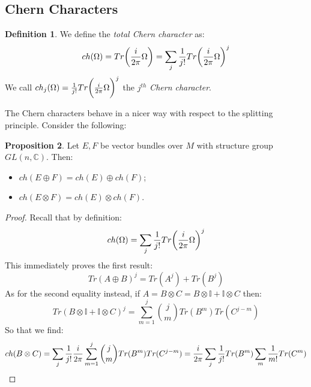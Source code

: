 \documentclass[12pt,a4paper]{report}
\theoremstyle{definition}
\newtheorem{Def}{Definition}[chapter]
\theoremstyle{Theorem}
\newtheorem{Prop}[Def]{Proposition}
\theoremstyle{definition}
\theoremstyle{definition}
\begin{document}
	\subsection{Chern Characters}
	\begin{Def}
		We define the \textit{total Chern character} as:
		$$ch(\Omega)=Tr\bigg({i\over 2\pi}\Omega\bigg)=\sum_j {1\over j!}Tr\bigg({i\over 2\pi}\Omega\bigg)^j$$
		We call $ch_j(\Omega)={1\over j!}Tr\bigg({i\over 2\pi}\Omega\bigg)^j$ the $j^{th}$ \textit{Chern character}.
	\end{Def}
	The Chern characters behave in a nicer way with respect to the splitting principle. Consider the following:
	\begin{Prop}
		Let $E,F$ be vector bundles over $M$ with structure group $GL(n,\mathbb{C})$. Then:
		\begin{itemize}
			\item $ch(E\oplus F)=ch(E)\oplus ch(F)$;
			\item $ch(E\otimes F)=ch(E)\otimes ch(F)$.
		\end{itemize}
	\end{Prop}
	\begin{proof}
		Recall that by definition:
		$$ch(\Omega)=\sum_j {1\over j!}Tr\bigg({i\over 2\pi}\Omega\bigg)^j$$
		This immediately proves the first result:
		$$Tr(A\oplus B)^j=Tr(A^j)+Tr(B^j)$$
		As for the second equality instead, if $A=B\otimes C=B\otimes \mathbb{I}+\mathbb{I}\otimes C$ then:
		$$Tr(B\otimes \mathbb{I}+\mathbb{I}\otimes C)^j=\sum_{m=1}^j {j \choose m}Tr(B^m)Tr(C^{j-m})$$
		So that we find:
		$$ch(B\otimes C)=\sum_j {1\over j!}{i\over 2\pi}\sum_{m=1}^j {j \choose m}Tr(B^m)Tr(C^{j-m})={i\over 2\pi}\sum_j {1\over j!}Tr(B^m)\sum_{m}{1\over m!}Tr(C^{m})$$
	\end{proof}
\end{document}
